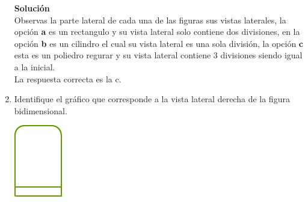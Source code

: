 \documentclass[11pt, a4paper]{article} %
\theoremstyle{dotlessP}
\theoremstyle{dotlessS}
\begin{document}
\begin{enumerate}[label=\color{dg}\theenumi.]
\begin{figure}[h!]
\end{figure}
 \textbf{Solución}\\
 Observas la parte lateral de cada una de las figuras sus vistas laterales, la opción \textbf{a}  es un rectangulo y su vista lateral solo contiene dos divisiones, en la opción \textbf{b}  es un cilindro el cual su vista lateral es una sola división, la opción \textbf{c}  esta es un poliedro regurar y su vista lateral contiene 3 divisiones siendo igual a la inicial.
 \\
 {\color{dh} La respuesta correcta es la c.}
 
   \item {\color{db} Identifique el gráfico que corresponde a la vista lateral derecha de la figura bidimensional. \\
        }
             \begin{center}
    \includegraphics[scale=1]{Figuras/130_1.pdf}
    \end{center}
    

\end{enumerate}
\end{document}
